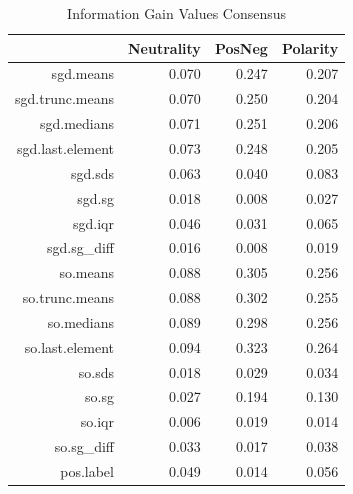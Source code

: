 \documentclass{sig-alternate}
\begin{document}
\begin{table}[ht]
\centering
\begin{tabular}{rrrr}
  \hline
 & Neutrality & PosNeg & Polarity \\ 
  \hline
sgd.means & 0.070 & 0.247 & 0.207 \\ 
  sgd.trunc.means & 0.070 & 0.250 & 0.204 \\ 
  sgd.medians & 0.071 & 0.251 & 0.206 \\ 
  sgd.last.element & 0.073 & 0.248 & 0.205 \\ 
  sgd.sds & 0.063 & 0.040 & 0.083 \\ 
  sgd.sg & 0.018 & 0.008 & 0.027 \\ 
  sgd.iqr & 0.046 & 0.031 & 0.065 \\ 
  sgd.sg\_diff & 0.016 & 0.008 & 0.019 \\ 
  so.means & 0.088 & 0.305 & 0.256 \\ 
  so.trunc.means & 0.088 & 0.302 & 0.255 \\ 
  so.medians & 0.089 & 0.298 & 0.256 \\ 
  so.last.element & 0.094 & 0.323 & 0.264 \\ 
  so.sds & 0.018 & 0.029 & 0.034 \\ 
  so.sg & 0.027 & 0.194 & 0.130 \\ 
  so.iqr & 0.006 & 0.019 & 0.014 \\ 
  so.sg\_diff & 0.033 & 0.017 & 0.038 \\ 
  pos.label & 0.049 & 0.014 & 0.056 \\ 
   \hline
\end{tabular}
\caption{Information Gain Values Consensus} 
\end{table}
\end{document}
